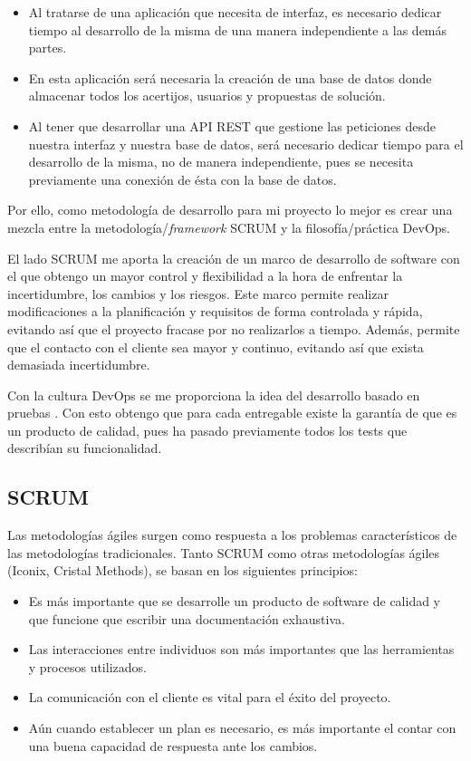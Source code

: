 \begin{itemize}
    \item Al tratarse de una aplicación que necesita de interfaz, es necesario dedicar tiempo al desarrollo de la misma de una manera independiente a las demás partes. 
    \item En esta aplicación será necesaria la creación de una base de datos donde almacenar todos los acertijos, usuarios y propuestas de solución.
    \item Al tener que desarrollar una API REST que gestione las peticiones desde nuestra interfaz y nuestra base de datos, será necesario dedicar tiempo para el desarrollo de la misma, no de manera independiente, pues se necesita previamente una conexión de ésta con la base de datos.
\end{itemize}

Por ello, como metodología de desarrollo para mi proyecto lo mejor es crear una mezcla entre la metodología/\textit{framework} SCRUM y la filosofía/práctica DevOps.

El lado SCRUM me aporta la creación de un marco de desarrollo de software con el que obtengo un mayor control y flexibilidad a la hora de enfrentar la incertidumbre, los cambios y los riesgos. Este marco permite realizar modificaciones a la planificación y requisitos de forma controlada y rápida, evitando así que el proyecto fracase por no realizarlos a tiempo. Además, permite que el contacto con el cliente sea mayor y continuo, evitando así que exista demasiada incertidumbre.

Con la cultura DevOps se me proporciona la idea del desarrollo basado en pruebas \cite{desarrollotests}\cite{desarrollotests2}. Con esto obtengo que para cada entregable existe la garantía de que es un producto de calidad, pues ha pasado previamente todos los tests que describían su funcionalidad.

\subsection{SCRUM}

Las metodologías ágiles\cite{scrum} surgen como respuesta a los problemas característicos de las metodologías tradicionales. Tanto SCRUM como otras metodologías ágiles (Iconix, Cristal Methods), se basan en los siguientes principios:

\begin{itemize}
    \item Es más importante que se desarrolle un producto de software de calidad y que funcione que escribir una documentación exhaustiva. 
    \item Las interacciones entre individuos son más importantes que las herramientas y procesos utilizados.
    \item La comunicación con el cliente es vital para el éxito del proyecto.
    \item Aún cuando establecer un plan es necesario, es más importante el contar con una buena capacidad de respuesta ante los cambios.
\end{itemize}

